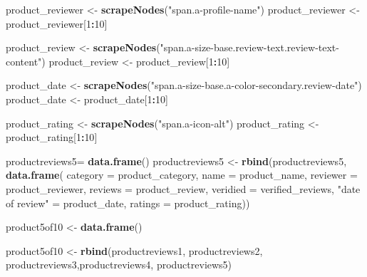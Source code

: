 \documentclass[
]{article}
\newenvironment{Shaded}{\begin{snugshade}}{\end{snugshade}}
\newcommand{\AttributeTok}[1]{\textcolor[rgb]{0.13,0.29,0.53}{#1}}
\newcommand{\DecValTok}[1]{\textcolor[rgb]{0.00,0.00,0.81}{#1}}
\newcommand{\FunctionTok}[1]{\textcolor[rgb]{0.13,0.29,0.53}{\textbf{#1}}}
\newcommand{\NormalTok}[1]{#1}
\newcommand{\OtherTok}[1]{\textcolor[rgb]{0.56,0.35,0.01}{#1}}
\newcommand{\SpecialCharTok}[1]{\textcolor[rgb]{0.81,0.36,0.00}{\textbf{#1}}}
\newcommand{\StringTok}[1]{\textcolor[rgb]{0.31,0.60,0.02}{#1}}
\begin{document}
\begin{Shaded}
\begin{Highlighting}[]
\NormalTok{  product\_reviewer }\OtherTok{\textless{}{-}} \FunctionTok{scrapeNodes}\NormalTok{(}\StringTok{"span.a{-}profile{-}name"}\NormalTok{)}
\NormalTok{  product\_reviewer }\OtherTok{\textless{}{-}}\NormalTok{ product\_reviewer[}\DecValTok{1}\SpecialCharTok{:}\DecValTok{10}\NormalTok{]}
  
\NormalTok{  product\_review }\OtherTok{\textless{}{-}} \FunctionTok{scrapeNodes}\NormalTok{(}\StringTok{"span.a{-}size{-}base.review{-}text.review{-}text{-}content"}\NormalTok{)}
\NormalTok{  product\_review }\OtherTok{\textless{}{-}}\NormalTok{ product\_review[}\DecValTok{1}\SpecialCharTok{:}\DecValTok{10}\NormalTok{]}
  
\NormalTok{  product\_date }\OtherTok{\textless{}{-}} \FunctionTok{scrapeNodes}\NormalTok{(}\StringTok{"span.a{-}size{-}base.a{-}color{-}secondary.review{-}date"}\NormalTok{)}
\NormalTok{  product\_date }\OtherTok{\textless{}{-}}\NormalTok{ product\_date[}\DecValTok{1}\SpecialCharTok{:}\DecValTok{10}\NormalTok{]}
  
\NormalTok{  product\_rating }\OtherTok{\textless{}{-}} \FunctionTok{scrapeNodes}\NormalTok{(}\StringTok{"span.a{-}icon{-}alt"}\NormalTok{)}
\NormalTok{  product\_rating }\OtherTok{\textless{}{-}}\NormalTok{ product\_rating[}\DecValTok{1}\SpecialCharTok{:}\DecValTok{10}\NormalTok{]}
  
\NormalTok{  productreviews5}\OtherTok{=} \FunctionTok{data.frame}\NormalTok{()}
\NormalTok{  productreviews5 }\OtherTok{\textless{}{-}} \FunctionTok{rbind}\NormalTok{(productreviews5, }\FunctionTok{data.frame}\NormalTok{(}
                      \AttributeTok{category =}\NormalTok{ product\_category,}
                      \AttributeTok{name =}\NormalTok{ product\_name,}
                      \AttributeTok{reviewer =}\NormalTok{ product\_reviewer,}
                      \AttributeTok{reviews =}\NormalTok{ product\_review,}
                      \AttributeTok{veridied =}\NormalTok{ verified\_reviews,}
                      \StringTok{"date of review"} \OtherTok{=}\NormalTok{ product\_date,}
                      \AttributeTok{ratings =}\NormalTok{ product\_rating))}
  
\NormalTok{  product5of10 }\OtherTok{\textless{}{-}} \FunctionTok{data.frame}\NormalTok{()}
  
\NormalTok{  product5of10 }\OtherTok{\textless{}{-}} \FunctionTok{rbind}\NormalTok{(productreviews1, productreviews2, productreviews3,productreviews4, productreviews5)}
\end{Highlighting}
\end{Shaded}
\end{document}
